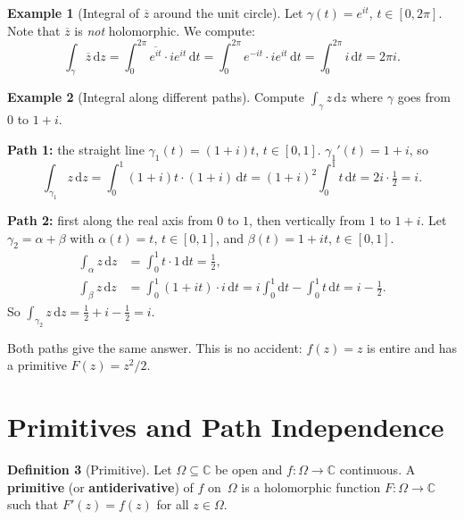 \documentclass[12pt,a4paper,openany]{book}
\theoremstyle{definition}
\newtheorem{definition}{Definition}[chapter]
\newtheorem{example}[definition]{Example}
\theoremstyle{plain}
\theoremstyle{remark}
\newcommand{\C}{\mathbb{C}}
\newcommand{\dd}{\mathrm{d}}
\newcommand{\conj}[1]{\overline{#1}}
\begin{document}
\begin{example}[Integral of $\conj{z}$ around the unit circle]\label{ex:integral-zbar}
Let $\gamma(t) = e^{it}$, $t\in[0,2\pi]$.  Note that $\conj{z}$ is
\emph{not} holomorphic.  We compute:
\[
  \int_\gamma\conj{z}\,\dd z
  = \int_0^{2\pi}\conj{e^{it}}\cdot ie^{it}\,\dd t
  = \int_0^{2\pi}e^{-it}\cdot ie^{it}\,\dd t
  = \int_0^{2\pi}i\,\dd t = 2\pi i.
\]
\end{example}

\begin{example}[Integral along different paths]\label{ex:path-dependence}
Compute $\int_\gamma z\,\dd z$ where $\gamma$ goes from $0$ to $1+i$.

\textbf{Path 1:} the straight line $\gamma_1(t) = (1+i)t$, $t\in[0,1]$.
$\gamma_1'(t)=1+i$, so
\[
  \int_{\gamma_1}z\,\dd z = \int_0^1(1+i)t\cdot(1+i)\,\dd t
  = (1+i)^2\int_0^1 t\,\dd t = 2i\cdot\tfrac{1}{2} = i.
\]

\textbf{Path 2:} first along the real axis from $0$ to $1$, then vertically
from $1$ to $1+i$.  Let $\gamma_2 = \alpha+\beta$ with $\alpha(t)=t$,
$t\in[0,1]$, and $\beta(t)=1+it$, $t\in[0,1]$.
\begin{align*}
  \int_\alpha z\,\dd z &= \int_0^1 t\cdot 1\,\dd t = \tfrac{1}{2}, \\
  \int_\beta z\,\dd z &= \int_0^1(1+it)\cdot i\,\dd t
  = i\int_0^1\dd t - \int_0^1 t\,\dd t = i - \tfrac{1}{2}.
\end{align*}
So $\int_{\gamma_2}z\,\dd z = \frac{1}{2}+i-\frac{1}{2} = i$.

Both paths give the same answer.  This is no accident: $f(z)=z$ is entire and
has a primitive $F(z)=z^2/2$.
\end{example}

\section{Primitives and Path Independence}
\label{sec:primitives}

\begin{definition}[Primitive]\label{def:primitive}
Let $\Omega\subseteq\C$ be open and $f\colon\Omega\to\C$ continuous.
A \textbf{primitive} (or \textbf{antiderivative}) of $f$
on~$\Omega$ is a holomorphic function $F\colon\Omega\to\C$ such that
$F'(z)=f(z)$ for all $z\in\Omega$.
\end{definition}
\end{document}
